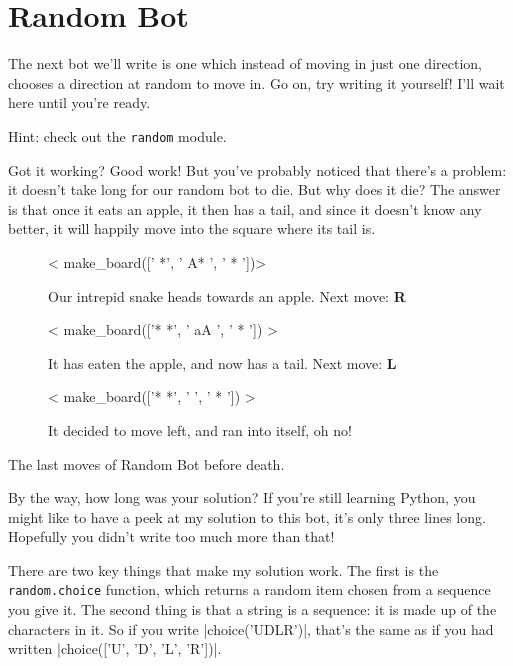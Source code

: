 
\section{Random Bot}

The next bot we’ll write is one which instead of moving in just one direction,
chooses a direction at random to move in.
Go on, try writing it yourself! I’ll wait here until you’re ready.

Hint: check out the \texttt{random} module.

Got it working? Good work!
But you’ve probably noticed that there’s a problem:
it doesn’t take long for our random bot to die.
But why does it die?
The answer is that once it eats an apple, it then has a tail, and since it
doesn’t know any better, it will happily move into the square where its tail is.

\begin{board}
\hfill
%
\begin{subfigure}{.3\linewidth}
< make_board(['   *', ' A* ', ' *  '])>
\caption{Our intrepid snake heads towards an apple. Next move: \textbf{R}}
\label{brd:random-death:1}
\end{subfigure}
\hfill
%
\begin{subfigure}{.3\linewidth}
< make_board(['*  *', ' aA ', ' *  ']) >
\caption{It has eaten the apple, and now has a tail. Next move: \textbf{L}}
\label{brd:random-death:2}
\end{subfigure}
\hfill
%
\begin{subfigure}{.3\linewidth}
< make_board(['*  *', '    ', ' *  ']) >
\caption{It decided to move left, and ran into itself, oh no!}
\label{brd:random-death:3}
\end{subfigure}
%
\hfill

\caption{The last moves of Random Bot before death.}
\label{brd:random-death}
\end{board}

\pagebreak

By the way, how long was your solution?
If you’re still learning Python, you might like to have a peek at my solution to
this bot, it’s only three lines long.
Hopefully you didn’t write too much more than that!


There are two key things that make my solution work.
The first is the \texttt{random.choice} function,
which returns a random item chosen from a sequence you give it.
The second thing is that a string is a sequence:
it is made up of the characters in it.
So if you write |choice('UDLR')|,
that’s the same as if you had written
|choice(['U', 'D', 'L', 'R'])|.

